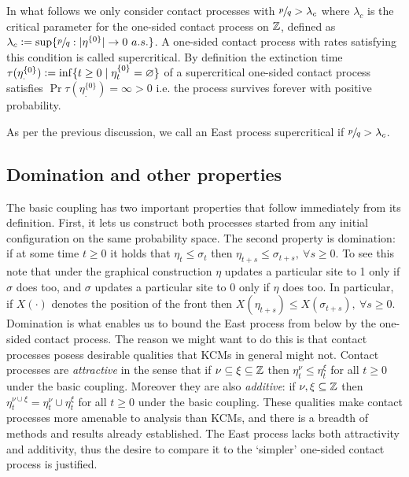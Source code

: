 In what follows we only consider contact processes with $\sfrac{p}{q} > \lambda_c$ where $\lambda_c$ is the critical parameter for the one-sided contact process on $\mathbb{Z}$, defined as $\lambda_c \vcentcolon= \sup\{ \sfrac{p}{q} : |\eta^{\{0\}}| \rightarrow 0\ a.s.\}$. A one-sided contact process with rates satisfying this condition is called supercritical. By definition the extinction time $\tau(\eta^{\{0\}}_.) \vcentcolon= \inf\{t \geq 0 \mid \eta^{\{0\}}_t = \varnothing \}$ of a supercritical one-sided contact process satisfies $\Pr{\tau(\eta^{\{0\}}_.) = \infty} > 0$ i.e. the process survives forever with positive probability. 

\begin{notation}
As per the previous discussion, we call an East process supercritical if $\sfrac{p}{q} > \lambda_c$. 
\end{notation}

\subsection{Domination and other properties}\label{ssec:intro_properties}
The basic coupling has two important properties that follow immediately from its definition. First, it lets us construct both processes started from any initial configuration on the same probability space. The second property is domination: if at some time $t \geq 0$ it holds that $\eta_t \leq \sigma_t$ then $\eta_{t+s} \leq \sigma_{t+s},\ \forall s \geq 0$. To see this note that under the graphical construction $\eta$ updates a particular site to 1 only if $\sigma$ does too, and $\sigma$ updates a particular site to 0 only if $\eta$ does too. In particular, if $X(\cdot)$ denotes the position of the front then $X(\eta_{t+s}) \leq X(\sigma_{t+s}),\ \forall s \geq 0$. \\

Domination is what enables us to bound the East process from below by the one-sided contact process. The reason we might want to do this is that contact processes posess desirable qualities that KCMs in general might not. Contact processes are \textit{attractive} in the sense that if $\nu \subseteq \xi \subseteq \mathbb{Z}$ then $\eta^\nu_t \leq \eta^\xi_t$ for all $t \geq 0$ under the basic coupling. Moreover they are also \textit{additive}: if $\nu, \xi \subseteq \mathbb{Z}$ then $\eta^{\nu \cup \xi}_t = \eta^\nu_t \cup \eta^\xi_t$ for all $t \geq 0$ under the basic coupling. These qualities make contact processes more amenable to analysis than KCMs, and there is a breadth of methods and results already established. The East process lacks both attractivity and additivity, thus the desire to compare it to the `simpler' one-sided contact process is justified. 
